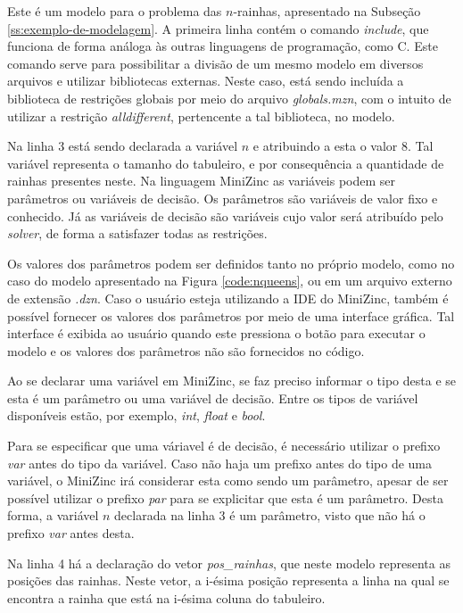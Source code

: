 Este é um modelo para o problema das $n$-rainhas, apresentado na Subseção \ref{ss:exemplo-de-modelagem}. A primeira linha contém o comando \textit{include}, que funciona de forma análoga às outras linguagens de programação, como C. Este comando serve para possibilitar a divisão de um mesmo modelo em diversos arquivos e utilizar bibliotecas externas. Neste caso, está sendo incluída a biblioteca de restrições globais por meio do arquivo \textit{globals.mzn}, com o intuito de utilizar a restrição \textit{alldifferent}, pertencente a tal biblioteca, no modelo.

Na linha 3 está sendo declarada a variável $n$ e atribuindo a esta o valor $8$. Tal variável representa o tamanho do tabuleiro, e por consequência a quantidade de rainhas presentes neste. Na linguagem MiniZinc as variáveis podem ser parâmetros ou variáveis de decisão. Os parâmetros são variáveis de valor fixo e conhecido. Já as variáveis de decisão são variáveis cujo valor será atribuído pelo \textit{solver}, de forma a satisfazer todas as restrições.

Os valores dos parâmetros podem ser definidos tanto no próprio modelo, como no caso do modelo apresentado na Figura \ref{code:nqueens}, ou em um arquivo externo de extensão \textit{.dzn}. Caso o usuário esteja utilizando a IDE do MiniZinc, também é possível fornecer os valores dos parâmetros por meio de uma interface gráfica. Tal interface é exibida ao usuário quando este pressiona o botão para executar o modelo e os valores dos parâmetros não são fornecidos no código.

Ao se declarar uma variável em MiniZinc, se faz preciso informar o tipo desta e se esta é um parâmetro ou uma variável de decisão. Entre os tipos de variável disponíveis estão, por exemplo, \textit{int}, \textit{float} e \textit{bool}.

Para se especificar que uma váriavel é de decisão, é necessário utilizar o prefixo \textit{var} antes do tipo da variável. Caso não haja um prefixo antes do tipo de uma variável, o MiniZinc irá considerar esta como sendo um parâmetro, apesar de ser possível utilizar o prefixo \textit{par} para se explicitar que esta é um parâmetro. Desta forma, a variável $n$ declarada na linha 3 é um parâmetro, visto que não há o prefixo \textit{var} antes desta.

Na linha 4 há a declaração do vetor \textit{pos\_rainhas}, que neste modelo representa as posições das rainhas. Neste vetor, a i-ésima posição representa a linha na qual se encontra a rainha que está na i-ésima coluna do tabuleiro.
  
